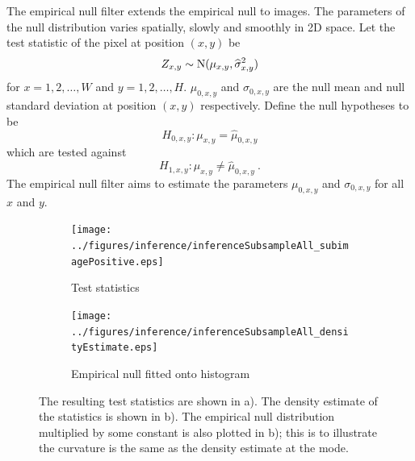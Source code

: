 The empirical null filter extends the empirical null to images. The parameters of the null distribution varies spatially, slowly and smoothly in 2D space. Let the test statistic of the pixel at position $(x,y)$ be
\begin{equation}
Z_{x,y}\sim\operatorname{N}(\mu_{x,y},\widehat{\sigma}_{x,y}^2)
\end{equation}
for $x=1,2,\dotsc,W$ and $y=1,2,\dotsc,H$. $\mu_{0,x,y}$ and $\sigma_{0,x,y}$ are the null mean and null standard deviation at position $(x,y)$ respectively. Define the null hypotheses to be
\begin{equation}
  H_{0,x,y}:\mu_{x,y}=\widehat{\mu}_{0,x,y}
\end{equation}
which are tested against
\begin{equation}
  H_{1,x,y}:\mu_{x,y}\neq\widehat{\mu}_{0,x,y} \ .
\end{equation}
 The empirical null filter aims to estimate the parameters $\mu_{0,x,y}$ and $\sigma_{0,x,y}$ for all $x$ and $y$.
 
 \begin{figure}[t]
  \centering
  \begin{subfigure}[b]{\subSize}
    \texttt{[image: ../figures/inference/inferenceSubsampleAll\_subimagePositive.eps]}
    \caption{Test statistics}
  \end{subfigure}
  \begin{subfigure}[b]{\subSize}
    \texttt{[image: ../figures/inference/inferenceSubsampleAll\_densityEstimate.eps]}
    \caption{Empirical null fitted onto histogram}
  \end{subfigure}
  \caption{The resulting test statistics are shown in a). The density estimate of the statistics is shown in b). The empirical null distribution multiplied by some constant is also plotted in b); this is to illustrate the curvature is the same as the density estimate at the mode.}
  \label{fig:inference_inferenceSubsampleAll}
\end{figure}

